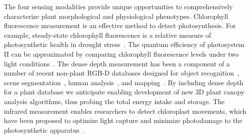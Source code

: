 The four sensing modalities provide unique opportunities to comprehensively characterize plant morphological and physiological phenotypes. Chlorophyll fluorescence measurement is an effective method to detect photosynthesis. For example, steady-state chlorophyll fluorescence is a relative measure of photosynthetic health in drought stress~\cite{chen2014dissecting}. The quantum efficiency of photosystem II can be approximated by comparing chlorophyll fluorescence levels under two light conditions~\cite{baker2008chlorophyll}. The dense depth measurement has been a component of a number of recent non-plant RGB-D databases designed for object recognition~\cite{Lai2011}, scene segmentation~\cite{Silberman2011}, human analysis~\cite{Sung2011,Barbosa:reid12}, and mapping~\cite{sturm12iros}. By including dense depth for a plant database we anticipate enabling development of new 3D plant canopy analysis algorithms, thus probing the total energy intake and storage. The infrared measurement enables researchers to detect chloroplast movements, which have been proposed to optimize light capture and minimize photodamage to the photosynthetic apparatus~\cite{Dutta2015Non}.  




